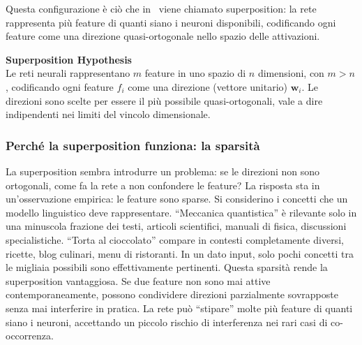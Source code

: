 Questa configurazione è ciò che in~\parencite{elhage2022toy} viene chiamato superposition: la rete rappresenta più feature di quanti siano i neuroni disponibili, codificando ogni feature come una direzione quasi-ortogonale nello spazio delle attivazioni.
\begin{notebox}
\textbf{Superposition Hypothesis}\\
Le reti neurali rappresentano $m$ feature in uno spazio di $n$ dimensioni, con $m > n$, codificando ogni feature $f_i$ come una direzione (vettore unitario) $\mathbf{w}_i$. Le direzioni sono scelte per essere il più possibile quasi-ortogonali, vale a dire indipendenti nei limiti del vincolo dimensionale.
\end{notebox}
\subsubsection{Perché la superposition funziona: la sparsità}
La superposition sembra introdurre un problema: se le direzioni non sono ortogonali, come fa la rete a non confondere le feature? La risposta sta in un'osservazione empirica: le feature sono sparse.
Si considerino i concetti che un modello linguistico deve rappresentare. ``Meccanica quantistica'' è rilevante solo in una minuscola frazione dei testi, articoli scientifici, manuali di fisica, discussioni specialistiche. ``Torta al cioccolato'' compare in contesti completamente diversi, ricette, blog culinari, menu di ristoranti. In un dato input, solo pochi concetti tra le migliaia possibili sono effettivamente pertinenti.
Questa sparsità rende la superposition vantaggiosa. Se due feature non sono mai attive contemporaneamente, possono condividere direzioni parzialmente sovrapposte senza mai interferire in pratica. La rete può ``stipare'' molte più feature di quanti siano i neuroni, accettando un piccolo rischio di interferenza nei rari casi di co-occorrenza.
